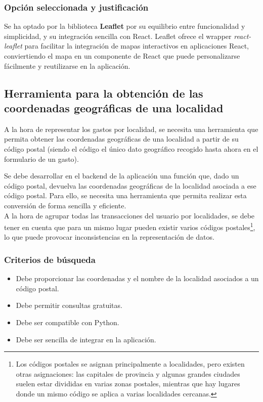\subsubsection{Opción seleccionada y justificación}
Se ha optado por la biblioteca \textbf{Leaflet} por su equilibrio entre funcionalidad y simplicidad, y su integración sencilla con React. Leaflet ofrece el wrapper \textit{react-leaflet} para facilitar la integración de mapas interactivos en aplicaciones React, conviertiendo el mapa en un componente de React que puede personalizarse fácilmente y reutilizarse en la aplicación.


\subsection{Herramienta para la obtención de las coordenadas geográficas de una localidad}
A la hora de representar los gastos por localidad, se necesita una herramienta que permita obtener las coordenadas geográficas de una localidad a partir de su código postal (siendo el código el único dato geográfico recogido hasta ahora en el formulario de un gasto). 

Se debe desarrollar en el backend de la aplicación una función que, dado un código postal, devuelva las coordenadas geográficas de la localidad asociada a ese código postal. Para ello, se necesita una herramienta que permita realizar esta conversión de forma sencilla y eficiente.\\

A la hora de agrupar todas las transacciones del usuario por localidades, se debe tener en cuenta que para un mismo lugar pueden existir varios códigos postales\footnote{Los códigos postales se asignan principalmente a localidades, pero existen otras asignaciones: las capitales de provincia y algunas grandes ciudades suelen estar divididas en varias zonas postales, mientras que hay lugares donde un mismo código se aplica a varias localidades cercanas\cite{cp-wikipedia}.}, lo que puede provocar inconsistencias en la representación de datos.

\subsubsection{Criterios de búsqueda}
\begin{itemize}
    \item Debe proporcionar las coordenadas y el nombre de la localidad asociados a un código postal.
    \item Debe permitir consultas gratuitas.
    \item Debe ser compatible con Python.
    \item Debe ser sencilla de integrar en la aplicación.
\end{itemize}
